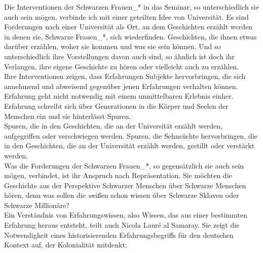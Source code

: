 \noindent Die Interventionen der Schwarzen Frauen\_* in das Seminar, so unterschiedlich sie
auch sein mögen, verbinde ich mit einer geteilten Idee von Universität. Es sind
Forderungen nach einer Universität als Ort, an dem Geschichten erzählt werden
in denen sie, Schwarze Frauen\_*, sich wiederfinden. Geschichten, die ihnen
etwas darüber erzählen, woher sie kommen und was sie sein können. Und so
unterschiedlich ihre Vorstellungen davon auch sind, so ähnlich ist doch ihr
Verlangen, ihre eigene Geschichte zu hören oder vielleicht auch zu erzählen.\\
Ihre Interventionen zeigen, dass Erfahrungen
Subjekte hervorbringen, die sich annehmend und abweisend gegenüber jenen
Erfahrungen verhalten können.\\
Erfahrung geht nicht notwendig mit einem
unmittelbaren Erlebnis einher. Erfahrung schreibt sich über Generationen in die
Körper und Seelen der Menschen ein und sie hinterlässt Spuren.\\
Spuren, die in den Geschichten, die an der Universität erzählt werden,
aufgegriffen oder verschwiegen werden. Spuren, die Sehnsüchte hervorbringen,
die in den Geschichten, die an der Universität erzählt werden, gestillt oder
verstärkt werden.\\
Was die Forderungen der Schwarzen Frauen\_*, so gegensätzlich
sie auch sein mögen, verbindet, ist ihr Anspruch nach Repräsentation. Sie
möchten die Geschichte aus der Perspektive Schwarzer Menschen über Schwarze
Menschen hören, denn was sollen die \textit{w}eißen schon wissen über Schwarze Sklaven
oder Schwarze Millionäre?\\
Ein Verständnis von Erfahrungswissen, also Wissen,
das aus einer bestimmten Erfahrung heraus entsteht, teilt auch Nicola Lauré al
Samaray. Sie zeigt die Notwendigkeit eines historisierenden Erfahrungsbegriffs
für den deutschen Kontext auf, der Kolonialität mitdenkt:

